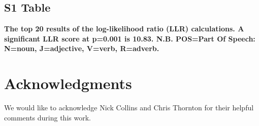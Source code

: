 \documentclass[10pt,letterpaper]{article}
\begin{document}
\subsection*{S1 Table}
\label{S1_Table}
{\bf The top 20 results of the log-likelihood ratio (LLR) calculations. A significant LLR score at p=0.001 is 10.83. N.B. POS=Part Of Speech: N=noun, J=adjective, V=verb, R=adverb.} 

\section*{Acknowledgments}
We would like to acknowledge Nick Collins and Chris Thornton for their helpful comments during this work. 

\nolinenumbers

%
%
% 
\end{document}

